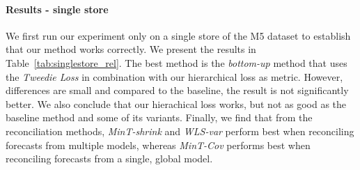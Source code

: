 \documentclass[preprint, 3p, times, twocolumn]{elsarticle}
\begin{document}
  \paragraph{Results - single store} We first run our experiment only on a single store of the M5 dataset to establish that our method works correctly. We present the results in Table~\ref{tab:singlestore_rel}. The best method is the \textit{bottom-up} method that uses the \textit{Tweedie Loss} in combination with our hierarchical loss as metric. However, differences are small and compared to the baseline, the result is not significantly better. We also conclude that our hierachical loss works, but not as good as the baseline method and some of its variants. Finally, we find that from the reconciliation methods, \textit{MinT-shrink} and \textit{WLS-var} perform best when reconciling forecasts from multiple models, whereas \textit{MinT-Cov} performs best when reconciling forecasts from a single, global model.
\end{document}
